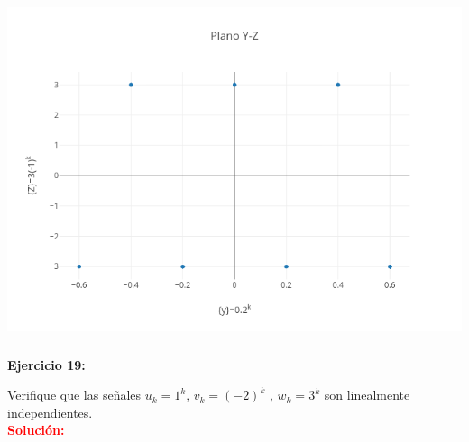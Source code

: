 \documentclass[12pt]{article}
\begin{document}
\includegraphics[height=10cm]{PlanoYZ.png}



%
\noindent \textbf{Ejercicio 19:}

Verifique que las señales $u_k=1^k$, $v_k=(-2)^k$ , $w_k= 3^k$ son linealmente independientes.\\

\noindent \textcolor{red}{\bf Solución:}\\
\end{document}
